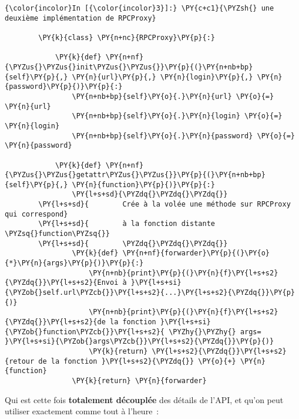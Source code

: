     \begin{Verbatim}[commandchars=\\\{\},frame=single,framerule=0.3mm,rulecolor=\color{cellframecolor}]
{\color{incolor}In [{\color{incolor}3}]:} \PY{c+c1}{\PYZsh{} une deuxième implémentation de RPCProxy}
        
        \PY{k}{class} \PY{n+nc}{RPCProxy}\PY{p}{:}
            
            \PY{k}{def} \PY{n+nf}{\PYZus{}\PYZus{}init\PYZus{}\PYZus{}}\PY{p}{(}\PY{n+nb+bp}{self}\PY{p}{,} \PY{n}{url}\PY{p}{,} \PY{n}{login}\PY{p}{,} \PY{n}{password}\PY{p}{)}\PY{p}{:}
                \PY{n+nb+bp}{self}\PY{o}{.}\PY{n}{url} \PY{o}{=} \PY{n}{url}
                \PY{n+nb+bp}{self}\PY{o}{.}\PY{n}{login} \PY{o}{=} \PY{n}{login}
                \PY{n+nb+bp}{self}\PY{o}{.}\PY{n}{password} \PY{o}{=} \PY{n}{password}
                
            \PY{k}{def} \PY{n+nf}{\PYZus{}\PYZus{}getattr\PYZus{}\PYZus{}}\PY{p}{(}\PY{n+nb+bp}{self}\PY{p}{,} \PY{n}{function}\PY{p}{)}\PY{p}{:}
                \PY{l+s+sd}{\PYZdq{}\PYZdq{}\PYZdq{}}
        \PY{l+s+sd}{        Crée à la volée une méthode sur RPCProxy qui correspond}
        \PY{l+s+sd}{        à la fonction distante \PYZsq{}function\PYZsq{}}
        \PY{l+s+sd}{        \PYZdq{}\PYZdq{}\PYZdq{}}
                \PY{k}{def} \PY{n+nf}{forwarder}\PY{p}{(}\PY{o}{*}\PY{n}{args}\PY{p}{)}\PY{p}{:}
                    \PY{n+nb}{print}\PY{p}{(}\PY{n}{f}\PY{l+s+s2}{\PYZdq{}}\PY{l+s+s2}{Envoi à }\PY{l+s+si}{\PYZob{}self.url\PYZcb{}}\PY{l+s+s2}{...}\PY{l+s+s2}{\PYZdq{}}\PY{p}{)}
                    \PY{n+nb}{print}\PY{p}{(}\PY{n}{f}\PY{l+s+s2}{\PYZdq{}}\PY{l+s+s2}{de la fonction }\PY{l+s+si}{\PYZob{}function\PYZcb{}}\PY{l+s+s2}{ \PYZhy{}\PYZhy{} args= }\PY{l+s+si}{\PYZob{}args\PYZcb{}}\PY{l+s+s2}{\PYZdq{}}\PY{p}{)}
                    \PY{k}{return} \PY{l+s+s2}{\PYZdq{}}\PY{l+s+s2}{retour de la fonction }\PY{l+s+s2}{\PYZdq{}} \PY{o}{+} \PY{n}{function}
                \PY{k}{return} \PY{n}{forwarder}
\end{Verbatim}


    Qui est cette fois \textbf{totalement découplée} des détails de l'API,
et qu'on peut utiliser exactement comme tout à l'heure~:

